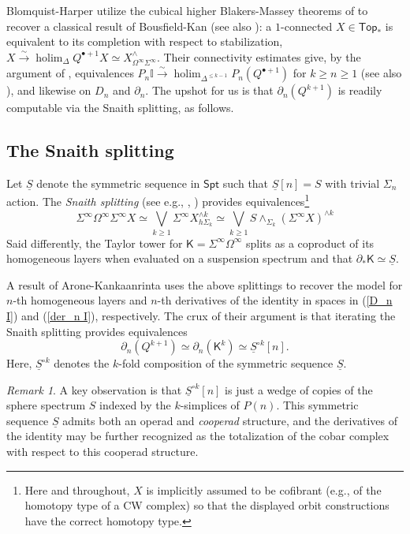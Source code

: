 \documentclass[12pt]{amsart}
\theoremstyle{definition}
\theoremstyle{remark}
\newtheorem{remark}[subsection]{Remark}
\newcommand{\Top}{\mathsf{Top}_*}
\newcommand{\Spt}{\mathsf{Spt}}
\newcommand{\Sp}{\Sigma^{\infty}}
\newcommand{\U}{\Omega^{\infty}}
\newcommand{\holim}{\operatorname{holim}}
\newcommand{\Id}{\mathbb{I}}
\newcommand{\uS}{\underline{S}}
\begin{document}
Blomquist-Harper \cite{BH} utilize the cubical higher Blakers-Massey theorems of \cite{Goo-Calc2} to recover a classical result of Bousfield-Kan \cite{BK} (see also \cite{Carl}): a $1$-connected $X\in \Top$ is equivalent to its completion with respect to stabilization, $X\xrightarrow{\sim} \holim_{\Delta}Q^{\bullet+1}X\simeq X_{\U \Sp}^{\wedge}$. Their connectivity estimates give, by the argument of \cite[Proposition 4.7]{Clark-1}, equivalences $P_n \Id \xrightarrow{\sim} \holim_{\Delta^{\leq k-1}} P_n (Q^{\bullet+1})$ for $k\geq n\geq 1$ (see also \cite[]{AC-1}), and likewise on $D_n$ and $\partial_n$. The upshot for us is that $\partial_n (Q^{k+1})$ is readily computable via the Snaith splitting, as follows.

\subsection{The Snaith splitting}
Let $\uS$ denote the symmetric sequence in $\Spt$ such that $\uS[n]=S$ with trivial $\Sigma_n$ action. The \textit{Snaith splitting} (see e.g., \cite{Snaith}, \cite{Coh-May-Tay}) provides equivalences\footnote{Here and throughout, $X$ is implicitly assumed to be cofibrant (e.g., of the homotopy type of a CW complex) so that the displayed orbit constructions have the correct homotopy type.}
\begin{equation} 
\label{Snaith}
    \Sp \U \Sp X \simeq \bigvee_{k\geq 1} \Sp X^{\wedge k}_{h\Sigma_k} \simeq \bigvee_{k\geq 1} S\wedge_{\Sigma_k} (\Sp X)^{\wedge k}
\end{equation}
Said differently, the Taylor tower for $\mathsf{K}=\Sp\U$ splits as a coproduct of its homogeneous layers when evaluated on a suspension spectrum and that $\partial_* \mathsf{K}\simeq \uS$. 

A result of Arone-Kankaanrinta \cite{AK} uses the above splittings to recover the model for $n$-th homogeneous layers and $n$-th derivatives of the identity in spaces in (\ref{D_n I}) and (\ref{der_n I}), respectively. The crux of their argument is that iterating the Snaith splitting provides equivalences \[\partial_n (Q^{k+1})\simeq \partial_n (\mathsf{K}^{k})\simeq \uS ^{\circ k}[n].\] 
Here, $\uS^{\circ k}$ denotes the $k$-fold composition of the symmetric sequence $\uS$.


\begin{remark}A key observation is that $\uS^{\circ k}[n]$ is just a wedge of copies of the sphere spectrum $S$ indexed by the $k$-simplices of $P(n)$. This symmetric sequence $\uS$ admits both an operad and \textit{cooperad} structure, and the derivatives of the identity may be further recognized as the totalization of the cobar complex with respect to this cooperad structure. 
\end{remark}
\end{document}
